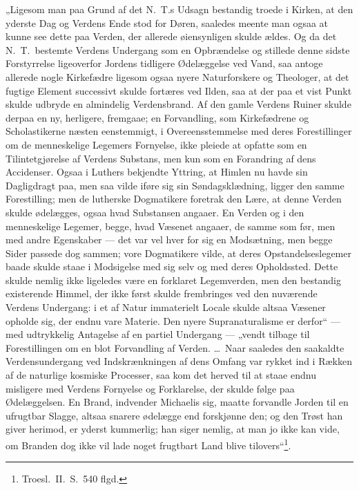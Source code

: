 \documentclass[12pt]{book}
\begin{document}
„Ligesom man paa Grund af det N.\ T.s Udsagn bestandig troede i
Kirken, at den yderste Dag og Verdens Ende stod for Døren, saaledes
meente man ogsaa at kunne see dette paa Verden, der allerede
øiensynligen skulde ældes. Og da det N.\ T.\ bestemte Verdens
Undergang som en Opbrændelse og stillede denne sidste Forstyrrelse
ligeoverfor Jordens tidligere Ødelæggelse ved Vand, saa antoge
allerede nogle Kirkefædre ligesom ogsaa nyere Naturforskere og
Theologer, at det fugtige Element successivt skulde fortæres ved
Ilden, saa at der paa et vist Punkt skulde udbryde en almindelig
Verdensbrand. Af den gamle Verdens Ruiner skulde derpaa en ny,
herligere, fremgaae; en Forvandling, som Kirkefædrene og
Scholastikerne næsten eenstemmigt, i Overeensstemmelse med deres
Forestillinger om de menneskelige Legemers Fornyelse, ikke pleiede
at opfatte som en Tilintetgjørelse af Verdens Substans, men kun som
en Forandring af dens Accidenser. Ogsaa i Luthers bekjendte Yttring,
at Himlen nu havde sin Dagligdragt paa, men saa vilde
iføre sig sin Søndagsklædning, ligger den samme Forestilling; men de
lutherske Dogmatikere foretrak den Lære, at denne Verden skulde
ødelægges, ogsaa hvad Substansen angaaer. En Verden og i den
menneskelige Legemer, begge, hvad Væsenet angaaer, de samme som før,
men med andre Egenskaber --- det var vel hver for sig en
Modsætning, men begge Sider passede dog sammen; vore Dogmatikere
vilde, at deres Opstandelseslegemer baade skulde staae i Modsigelse
med sig selv og med deres Opholdssted. Dette skulde nemlig ikke
ligeledes være en forklaret Legemverden, men den bestandig
existerende Himmel, der ikke først skulde frembringes ved den
nuværende Verdens Undergang: i et af Natur immaterielt Locale skulde
altsaa Væsener opholde sig, der endnu vare Materie. Den nyere
Supranaturalisme er derfor“ --- med udtrykkelig Antagelse af en
partiel Undergang --- „vendt tilbage til Forestillingen om en blot
Forvandling af Verden. \dots\ Naar saaledes den saakaldte
Verdensundergang ved Indskrænkningen af dens Omfang var rykket ind i
Rækken af de naturlige kosmiske Processer, saa kom det herved til at
staae endnu misligere med Verdens Fornyelse og Forklarelse, der
skulde følge paa Ødelæggelsen. En Brand, indvender Michaelis sig,
maatte forvandle Jorden til en ufrugtbar Slagge, altsaa snarere
ødelægge end forskjønne den; og den Trøst han giver herimod, er
yderst kummerlig; han siger nemlig, at man jo ikke kan vide, om
Branden dog ikke vil lade noget frugtbart Land blive
tilovers“\footnote{Troesl.\ II.\ S.\ 540 flgd.}.
\end{document}
